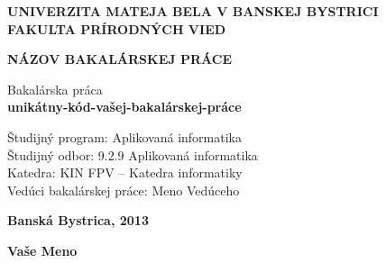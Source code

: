 \begin{titlepage}

\begin{center}

\begin{spacing}{1.5} 
{\Large \bfseries UNIVERZITA MATEJA BELA V BANSKEJ BYSTRICI\\
FAKULTA PRÍRODNÝCH VIED}\\[5cm]
\end{spacing}

\begin{spacing}{1.5} 
{\Large \bfseries NÁZOV BAKALÁRSKEJ PRÁCE}\\
\end{spacing}

{\large Bakalárska práca}\\
\bfseries unikátny-kód-vašej-bakalárskej-práce\\[5cm]
\end{center}

\begin{flushleft}
Študijný program: Aplikovaná informatika\\
Študijný odbor: 9.2.9 Aplikovaná informatika\\
Katedra: KIN FPV – Katedra informatiky\\
Vedúci bakalárskej práce: Meno Vedúceho\\

\end{flushleft}

\vfill

\begin{minipage}{0.5\textwidth}
\begin{flushleft}
\textbf{Banská Bystrica, 2013}
\end{flushleft}
\end{minipage}
\begin{minipage}{0.5\textwidth}
\begin{flushright}
\textbf{Vaše Meno}
\end{flushright}
\end{minipage}

\end{titlepage}

\thispagestyle{empty}